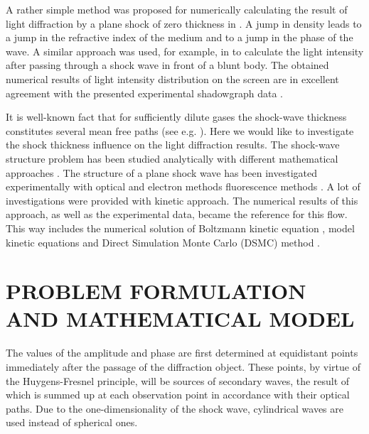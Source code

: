 \documentclass{aip-cp}
\begin{document}
A rather simple method was proposed for numerically calculating the result of light diffraction by a plane shock of zero thickness in \cite{Pfeifer}. A jump in density leads to a jump in the refractive index of the medium and to a jump in the phase of the wave. A similar approach was used, for example, in \cite{Panda_1995} to calculate the light intensity after passing through a shock wave in front of a blunt body. The obtained numerical results of light intensity distribution on the screen are in excellent agreement with the presented experimental shadowgraph data \cite{Pfeifer,Panda_1995}.

It is well-known fact that for sufficiently dilute gases the shock-wave thickness constitutes several mean free paths (see e.g. \cite{Kogan, Cercignani_book}). Here we would like to investigate the shock thickness influence on the light diffraction results. The shock-wave structure problem has been studied analytically with different mathematical approaches \cite{Becker_1922, Mott-Smith_1951, Salwen_1964, Holway_1964, Yen_1966}. The structure of a plane shock wave has been investigated experimentally with optical and electron methods fluorescence methods \cite{Hornig_1950, Hansen_Hornig_1960, Robben, Alsmeyer_1976, Pham-Van-Diep624}. A lot of investigations were provided with kinetic approach. The numerical results of this approach, as well as the experimental data, became the reference for this flow. This way includes the numerical solution of Boltzmann kinetic equation  \citep{Ohwada_shock, Dodulad_Tcheremissine_2013, ShockWaves_2015}, model kinetic equations \citep{Shakhov, Rykov2008} and Direct Simulation Monte Carlo (DSMC) method \citep{Belotserkovskii, Pham-Van-Diep624, Erofeev_Friedlander_overshoot_2002, overshoot_2015}.

\section{PROBLEM FORMULATION AND MATHEMATICAL MODEL}

The values of the amplitude and phase are first determined at equidistant points immediately after the passage of the diffraction object. These points, by virtue of the Huygens-Fresnel principle, will be sources of secondary waves, the result of which is summed up at each observation point in accordance with their optical paths. Due to the one-dimensionality of the shock wave, cylindrical waves are used instead of spherical ones.
\end{document}
